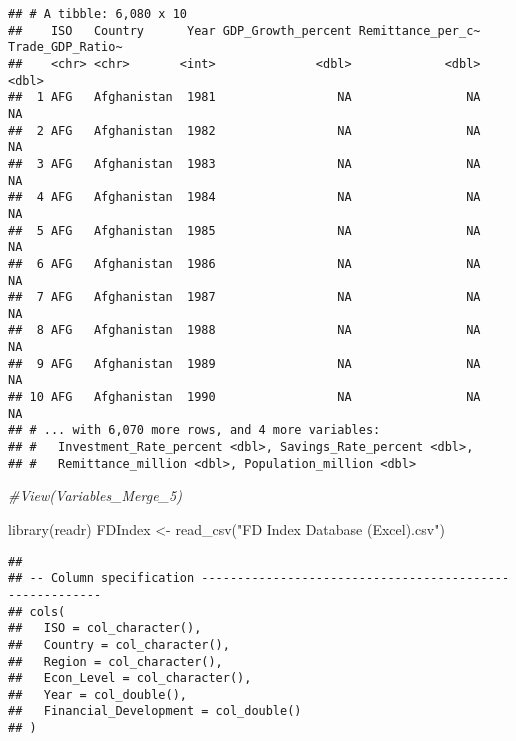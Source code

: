 \documentclass[
]{article}
\newenvironment{Shaded}{\begin{snugshade}}{\end{snugshade}}
\newcommand{\CommentTok}[1]{\textcolor[rgb]{0.56,0.35,0.01}{\textit{#1}}}
\newcommand{\FunctionTok}[1]{\textcolor[rgb]{0.00,0.00,0.00}{#1}}
\newcommand{\NormalTok}[1]{#1}
\newcommand{\OtherTok}[1]{\textcolor[rgb]{0.56,0.35,0.01}{#1}}
\newcommand{\StringTok}[1]{\textcolor[rgb]{0.31,0.60,0.02}{#1}}
\begin{document}
\begin{verbatim}
## # A tibble: 6,080 x 10
##    ISO   Country      Year GDP_Growth_percent Remittance_per_c~ Trade_GDP_Ratio~
##    <chr> <chr>       <int>              <dbl>             <dbl>            <dbl>
##  1 AFG   Afghanistan  1981                 NA                NA               NA
##  2 AFG   Afghanistan  1982                 NA                NA               NA
##  3 AFG   Afghanistan  1983                 NA                NA               NA
##  4 AFG   Afghanistan  1984                 NA                NA               NA
##  5 AFG   Afghanistan  1985                 NA                NA               NA
##  6 AFG   Afghanistan  1986                 NA                NA               NA
##  7 AFG   Afghanistan  1987                 NA                NA               NA
##  8 AFG   Afghanistan  1988                 NA                NA               NA
##  9 AFG   Afghanistan  1989                 NA                NA               NA
## 10 AFG   Afghanistan  1990                 NA                NA               NA
## # ... with 6,070 more rows, and 4 more variables:
## #   Investment_Rate_percent <dbl>, Savings_Rate_percent <dbl>,
## #   Remittance_million <dbl>, Population_million <dbl>
\end{verbatim}

\begin{Shaded}
\begin{Highlighting}[]
\CommentTok{\#View(Variables\_Merge\_5)}
\end{Highlighting}
\end{Shaded}

\begin{Shaded}
\begin{Highlighting}[]
\FunctionTok{library}\NormalTok{(readr)}
\NormalTok{FDIndex }\OtherTok{\textless{}{-}} \FunctionTok{read\_csv}\NormalTok{(}\StringTok{"FD Index Database (Excel).csv"}\NormalTok{)}
\end{Highlighting}
\end{Shaded}

\begin{verbatim}
## 
## -- Column specification --------------------------------------------------------
## cols(
##   ISO = col_character(),
##   Country = col_character(),
##   Region = col_character(),
##   Econ_Level = col_character(),
##   Year = col_double(),
##   Financial_Development = col_double()
## )
\end{verbatim}
\end{document}
